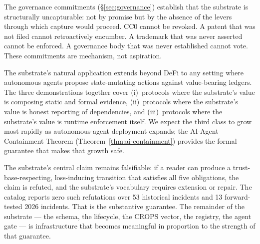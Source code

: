 \documentclass[11pt,a4paper]{article}
\begin{document}
The governance commitments (\S\ref{sec:governance}) establish that the substrate is structurally uncapturable: not by promise but by the absence of the levers through which capture would proceed. CC0 cannot be revoked. A patent that was not filed cannot retroactively encumber. A trademark that was never asserted cannot be enforced. A governance body that was never established cannot vote. These commitments are mechanism, not aspiration.

The substrate's natural application extends beyond DeFi to any setting where autonomous agents propose state-mutating actions against value-bearing ledgers. The three demonstrations together cover (i)~protocols where the substrate's value is composing static and formal evidence, (ii)~protocols where the substrate's value is honest reporting of dependencies, and (iii)~protocols where the substrate's value is runtime enforcement itself. We expect the third class to grow most rapidly as autonomous-agent deployment expands; the AI-Agent Containment Theorem (Theorem~\ref{thm:ai-containment}) provides the formal guarantee that makes that growth safe.

The substrate's central claim remains falsifiable: if a reader can produce a trust-base-respecting, loss-inducing transition that satisfies all five obligations, the claim is refuted, and the substrate's vocabulary requires extension or repair. The catalog reports zero such refutations over 53 historical incidents and 13 forward-tested 2026 incidents. That is the substantive guarantee. The remainder of the substrate --- the schema, the lifecycle, the CROPS vector, the registry, the agent gate --- is infrastructure that becomes meaningful in proportion to the strength of that guarantee.

\clearpage
\end{document}
